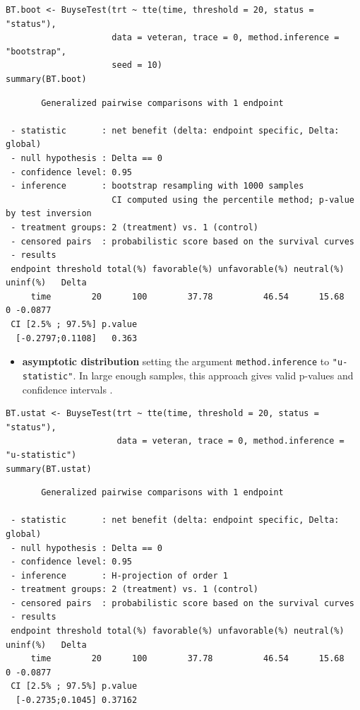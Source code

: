 \documentclass[12pt]{article}
\begin{document}
\lstset{language=r,label= ,caption= ,captionpos=b,numbers=none}
\begin{lstlisting}
BT.boot <- BuyseTest(trt ~ tte(time, threshold = 20, status = "status"),
                     data = veteran, trace = 0, method.inference = "bootstrap",
                     seed = 10) 
summary(BT.boot)
\end{lstlisting}

\begin{verbatim}
       Generalized pairwise comparisons with 1 endpoint

 - statistic       : net benefit (delta: endpoint specific, Delta: global) 
 - null hypothesis : Delta == 0 
 - confidence level: 0.95 
 - inference       : bootstrap resampling with 1000 samples 
                     CI computed using the percentile method; p-value by test inversion 
 - treatment groups: 2 (treatment) vs. 1 (control) 
 - censored pairs  : probabilistic score based on the survival curves
 - results
 endpoint threshold total(%) favorable(%) unfavorable(%) neutral(%) uninf(%)   Delta
     time        20      100        37.78          46.54      15.68        0 -0.0877
 CI [2.5% ; 97.5%] p.value 
  [-0.2797;0.1108]   0.363
\end{verbatim}

\begin{itemize}
\item \textbf{asymptotic distribution} setting the argument \texttt{method.inference} to
\texttt{"u-statistic"}. In large enough samples, this approach gives valid
p-values and confidence intervals \citep{ozenne2021asymptotic}.
\end{itemize}

\lstset{language=r,label= ,caption= ,captionpos=b,numbers=none}
\begin{lstlisting}
BT.ustat <- BuyseTest(trt ~ tte(time, threshold = 20, status = "status"),
                      data = veteran, trace = 0, method.inference = "u-statistic") 
summary(BT.ustat)
\end{lstlisting}

\begin{verbatim}
       Generalized pairwise comparisons with 1 endpoint

 - statistic       : net benefit (delta: endpoint specific, Delta: global) 
 - null hypothesis : Delta == 0 
 - confidence level: 0.95 
 - inference       : H-projection of order 1
 - treatment groups: 2 (treatment) vs. 1 (control) 
 - censored pairs  : probabilistic score based on the survival curves
 - results
 endpoint threshold total(%) favorable(%) unfavorable(%) neutral(%) uninf(%)   Delta
     time        20      100        37.78          46.54      15.68        0 -0.0877
 CI [2.5% ; 97.5%] p.value 
  [-0.2735;0.1045] 0.37162
\end{verbatim}
\end{document}
